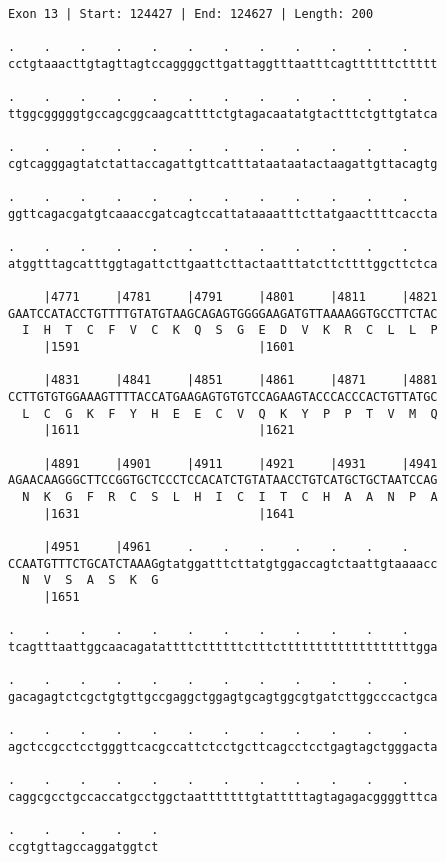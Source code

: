 \documentclass{article}
\begin{document}
\begin{Verbatim}
Exon 13 | Start: 124427 | End: 124627 | Length: 200
 
.    .    .    .    .    .    .    .    .    .    .    .    
cctgtaaacttgtagttagtccaggggcttgattaggtttaatttcagttttttcttttt
  
.    .    .    .    .    .    .    .    .    .    .    .    
ttggcgggggtgccagcggcaagcattttctgtagacaatatgtactttctgttgtatca
  
.    .    .    .    .    .    .    .    .    .    .    .    
cgtcagggagtatctattaccagattgttcatttataataatactaagattgttacagtg
  
.    .    .    .    .    .    .    .    .    .    .    .    
ggttcagacgatgtcaaaccgatcagtccattataaaatttcttatgaacttttcaccta
  
.    .    .    .    .    .    .    .    .    .    .    .    
atggtttagcatttggtagattcttgaattcttactaatttatcttcttttggcttctca
  
     |4771     |4781     |4791     |4801     |4811     |4821
GAATCCATACCTGTTTTGTATGTAAGCAGAGTGGGGAAGATGTTAAAAGGTGCCTTCTAC
  I  H  T  C  F  V  C  K  Q  S  G  E  D  V  K  R  C  L  L  P
     |1591                         |1601                    
  
     |4831     |4841     |4851     |4861     |4871     |4881
CCTTGTGTGGAAAGTTTTACCATGAAGAGTGTGTCCAGAAGTACCCACCCACTGTTATGC
  L  C  G  K  F  Y  H  E  E  C  V  Q  K  Y  P  P  T  V  M  Q
     |1611                         |1621                    
  
     |4891     |4901     |4911     |4921     |4931     |4941
AGAACAAGGGCTTCCGGTGCTCCCTCCACATCTGTATAACCTGTCATGCTGCTAATCCAG
  N  K  G  F  R  C  S  L  H  I  C  I  T  C  H  A  A  N  P  A
     |1631                         |1641                    
  
     |4951     |4961     .    .    .    .    .    .    .    
CCAATGTTTCTGCATCTAAAGgtatggatttcttatgtggaccagtctaattgtaaaacc
  N  V  S  A  S  K  G                                       
     |1651                                                  
  
.    .    .    .    .    .    .    .    .    .    .    .    
tcagtttaattggcaacagatattttcttttttctttctttttttttttttttttttgga
  
.    .    .    .    .    .    .    .    .    .    .    .    
gacagagtctcgctgtgttgccgaggctggagtgcagtggcgtgatcttggcccactgca
  
.    .    .    .    .    .    .    .    .    .    .    .    
agctccgcctcctgggttcacgccattctcctgcttcagcctcctgagtagctgggacta
  
.    .    .    .    .    .    .    .    .    .    .    .    
caggcgcctgccaccatgcctggctaatttttttgtatttttagtagagacggggtttca
  
.    .    .    .    .
ccgtgttagccaggatggtct
\end{Verbatim}
\end{document}
